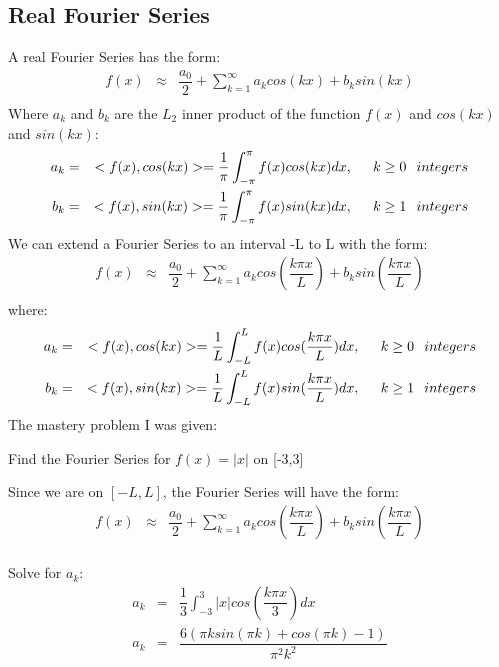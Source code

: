 \documentclass{article}
\newcommand{\bea}{\begin{eqnarray*}}
\newcommand{\eea}{\end{eqnarray*}}
\newcommand{\red}[1]{\textcolor{red}{#1}}
\begin{document}
\subsection{Real Fourier Series}
A real Fourier Series has the form:
\bea
f(x) &\approx& \dfrac{a_0}{2}+\sum_{k=1}^{\infty} a_kcos(kx)+b_ksin(kx) \\
\eea
Where $a_k$ and $b_k$ are the $L_2$ inner product of the function $f(x)$ and $cos(kx)$ and $sin(kx)$: 
\bea
a_k &=& <f(x),cos(kx)> = \dfrac{1}{\pi}\int_{-\pi}^{\pi} f(x)cos(kx)dx, \hspace{.2in} k\geq0 \hspace{.1in} integers \\
b_k &=& <f(x),sin(kx)> = \dfrac{1}{\pi}\int_{-\pi}^{\pi} f(x)sin(kx)dx, \hspace{.2in} k\geq1 \hspace{.1in} integers \\
\eea
We can extend a Fourier Series to an interval -L to L with the form:
\bea
f(x) &\approx& \dfrac{a_0}{2}+\sum_{k=1}^{\infty} a_kcos(\dfrac{k \pi x}{L})+b_ksin(\dfrac{k \pi x}{L}) \\
\eea
where:
\bea
a_k &=& <f(x),cos(kx)> = \dfrac{1}{L}\int_{-L}^{L} f(x)cos(\dfrac{k \pi x}{L})dx, \hspace{.2in}  k\geq0 \hspace{.1in} integers \\
b_k &=& <f(x),sin(kx)> = \dfrac{1}{L}\int_{-L}^{L} f(x)sin(\dfrac{k \pi x}{L})dx, \hspace{.2in} k\geq1 \hspace{.1in} integers \\
\eea
The mastery problem I was given:\newline

Find the Fourier Series for $f(x)=|x|$ on [-3,3]\newline

Since we are on $[-L,L]$, the Fourier Series will have the form:
\bea
f(x) &\approx& \dfrac{a_0}{2}+\sum_{k=1}^{\infty} a_kcos(\dfrac{k \pi x}{L})+b_ksin(\dfrac{k \pi x}{L}) \\
\eea

Solve for $a_k$:
\bea
a_k &=& \dfrac{1}{3}\int_{-3}^{3} |x|cos(\dfrac{k \pi x}{3})dx\\
a_k &=& \dfrac{6(\pi k sin(\pi k)+cos(\pi k) -1)}{\pi^2 k^2}\\
\eea
\end{document}
